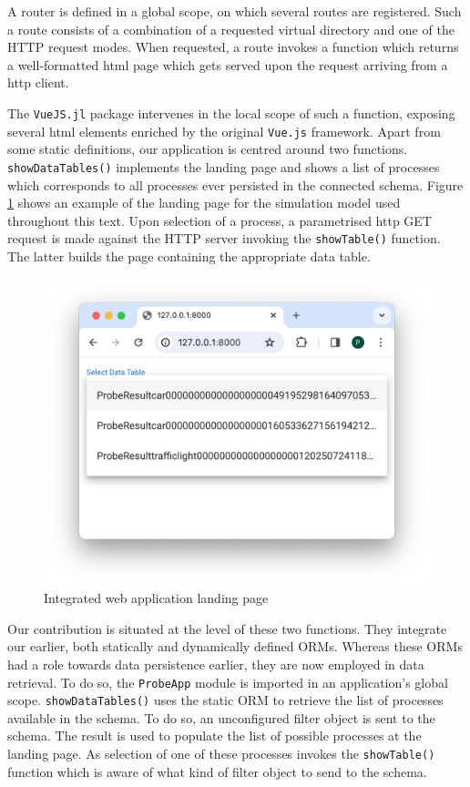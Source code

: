 \documentclass{juliacon}
\begin{document}
A router is defined in a global scope, on which several routes are registered. Such a route consists of a combination of a requested virtual directory and one of the HTTP request modes. When requested, a route invokes a function which returns a well-formatted html page which gets served upon the request arriving from a http client.\vskip 6pt

The \texttt{VueJS.jl} package intervenes in the local scope of such a function, exposing several html elements enriched by the original \texttt{Vue.js} framework. Apart from some static definitions, our application is centred around two functions. \texttt{showDataTables()} implements the landing page and shows a list of processes which corresponds to all processes ever persisted in the connected schema. Figure \ref{fig:vApplanding} shows an example of the landing page for the simulation model used throughout this text. Upon selection of a process, a parametrised http GET request is made against the HTTP server invoking the \texttt{showTable()} function. The latter builds the page containing the appropriate data table.

\begin{figure}[th]
	\centering
	\includegraphics[width=0.9\linewidth]{images/VueApp}
	\caption{Integrated web application landing page}
	\label{fig:vApplanding}
\end{figure}

Our contribution is situated at the level of these two functions. They integrate our earlier, both statically and dynamically defined ORMs. Whereas these ORMs had a role towards data persistence earlier, they are  now employed in data retrieval. To do so, the \texttt{ProbeApp} module is imported in an application's global scope. \texttt{showDataTables()} uses the static ORM to retrieve the list of processes available in the schema. To do so, an unconfigured filter object is sent to the schema. The result is used to populate the list of possible processes at the landing page. As selection of one of these processes invokes the \texttt{showTable()} function which is aware of what kind of filter object to send to the schema.\vskip 6pt
\end{document}
